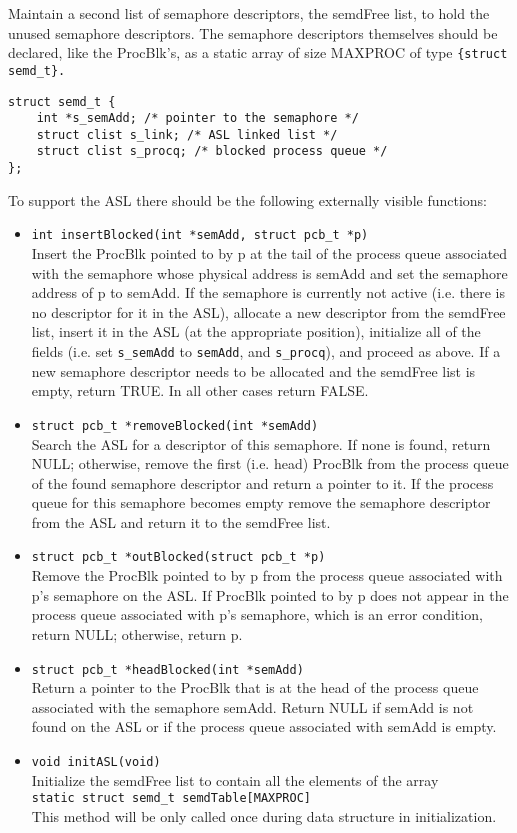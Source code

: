 Maintain a second list of semaphore descriptors, the semdFree list, to hold the unused semaphore descriptors. 
The semaphore descriptors themselves should be declared, like the ProcBlk’s, as a static array of size MAXPROC of type \verb+{struct semd_t}.+

\begin{lstlisting}
struct semd_t {
    int *s_semAdd; /* pointer to the semaphore */
    struct clist s_link; /* ASL linked list */
    struct clist s_procq; /* blocked process queue */
};
\end{lstlisting}

To support the ASL there should be the following externally visible functions:
\begin{itemize}
	\item \verb+int insertBlocked(int *semAdd, struct pcb_t *p)+\\
		Insert the ProcBlk pointed to by p at the tail of the process queue associated with the semaphore whose physical address is semAdd and set the semaphore address of p to semAdd. 
		If the semaphore is currently not active (i.e. there is no descriptor for it in the ASL), allocate a new descriptor from the semdFree list, insert it in the ASL (at the appropriate position), initialize all of the fields (i.e. set \verb+s_semAdd+ to \verb+semAdd+, and \verb+s_procq+), and proceed as above. 
		If a new semaphore descriptor needs to be allocated and the semdFree list is empty, return TRUE. In all other cases return FALSE.
	\item \verb+struct pcb_t *removeBlocked(int *semAdd)+\\
		Search the ASL for a descriptor of this semaphore. 
		If none is found, return NULL; otherwise, remove the first (i.e. head) ProcBlk from the process queue of the found semaphore descriptor and return a pointer to it. 
		If the process queue for this semaphore becomes empty remove the semaphore descriptor from the ASL and return it to the semdFree list.
	\item \verb+struct pcb_t *outBlocked(struct pcb_t *p)+\\
		Remove the ProcBlk pointed to by p from the process queue associated with p’s semaphore on the ASL.
		If ProcBlk pointed to by p does not appear in the process queue associated with p’s semaphore, which is an error condition, return NULL; otherwise, return p. 
	\item \verb+struct pcb_t *headBlocked(int *semAdd)+\\
		Return a pointer to the ProcBlk that is at the head of the process queue associated with the semaphore semAdd. 
		Return NULL if semAdd is not found on the ASL or if the process queue associated with semAdd is empty.
	\item \verb+void initASL(void)+\\
		Initialize the semdFree list to contain all the elements of the array \\
		\verb+static struct semd_t semdTable[MAXPROC]+\\
		This method will be only called once during data structure in initialization.
\end{itemize}

